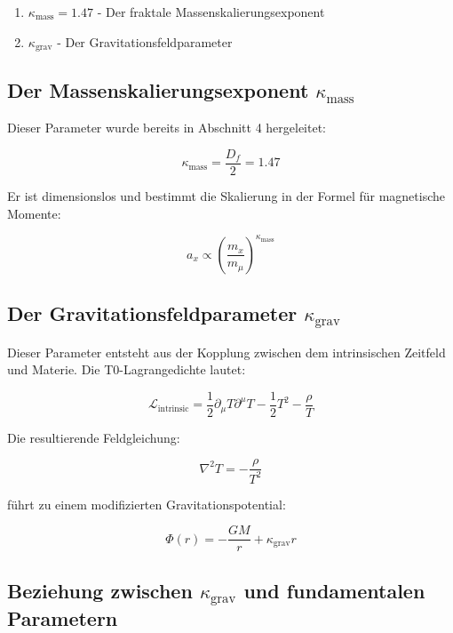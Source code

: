 \documentclass[12pt,a4paper]{article}
\theoremstyle{definition}
\begin{document}
	\begin{enumerate}
		\item $\kappa_{\text{mass}} = 1.47$ - Der fraktale Massenskalierungsexponent
		\item $\kappa_{\text{grav}}$ - Der Gravitationsfeldparameter
	\end{enumerate}
	
	\subsection{Der Massenskalierungsexponent $\kappa_{\text{mass}}$}
	
	Dieser Parameter wurde bereits in Abschnitt 4 hergeleitet:
	
	\begin{equation}
		\kappa_{\text{mass}} = \frac{D_f}{2} = 1.47
	\end{equation}
	
	Er ist dimensionslos und bestimmt die Skalierung in der Formel f\"ur magnetische Momente:
	
	\begin{equation}
		a_x \propto \left(\frac{m_x}{m_\mu}\right)^{\kappa_{\text{mass}}}
	\end{equation}
	
	\subsection{Der Gravitationsfeldparameter $\kappa_{\text{grav}}$}
	
	Dieser Parameter entsteht aus der Kopplung zwischen dem intrinsischen Zeitfeld und Materie. Die T0-Lagrangedichte lautet:
	
	\begin{equation}
		\mathcal{L}_{\text{intrinsic}} = \frac{1}{2}\partial_\mu T \partial^\mu T - \frac{1}{2}T^2 - \frac{\rho}{T}
	\end{equation}
	
	Die resultierende Feldgleichung:
	
	\begin{equation}
		\nabla^2 T = -\frac{\rho}{T^2}
	\end{equation}
	
	f\"uhrt zu einem modifizierten Gravitationspotential:
	
	\begin{equation}
		\Phi(r) = -\frac{GM}{r} + \kappa_{\text{grav}} r
	\end{equation}
	
	\subsection{Beziehung zwischen $\kappa_{\text{grav}}$ und fundamentalen Parametern}
	
\end{document}

